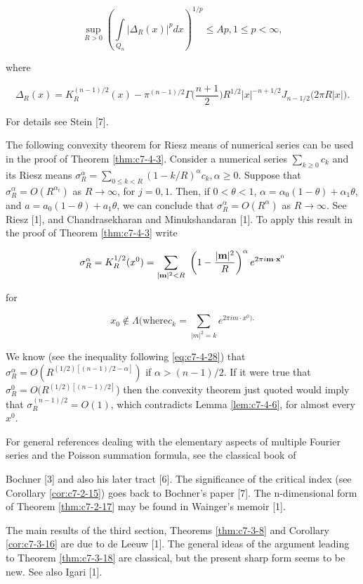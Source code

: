 \[
\sup_{R>0}\left(\int\limits_{Q_{n}}\left|\Delta_{R}(x)\right|^{p} dx\right)^{1/p}\leq A p,1\leq p<\infty,
\]

where

\[
\Delta_{R}(x)=K_{R}^{(n-1)/2}(x)-\pi^{(n-1)/2}\Gamma\biggl(\frac{n+1}{2}\biggr)R^{1/2}\big|x\big|^{-n+1/2}J_{n-1/2}(2\pi R|x|\big).
\]

For details see Stein [7].

 The following convexity theorem for Riesz means of numerical series can be used in the proof of Theorem \ref{thm:c7-4-3}. Consider a numerical series $\sum_{k \geq 0} c_k$ and its Riesz means $\sigma_R^\alpha = \sum_{0 \leq k < R} (1 - k/R)^\alpha c_k, \alpha \geq 0$. Suppose that $\sigma_R^\alpha = O(R^{\alpha_t})$ as $R \to \infty$, for $j = 0, 1$. Then, if $0 < \theta < 1$, $\alpha = \alpha_0(1 - \theta) + \alpha_1\theta$, and $a = a_0(1 - \theta) + a_1\theta$, we can conclude that $\sigma_R^\alpha = O(R^\alpha)$ as $R \to \infty$. See Riesz [1], and Chandrasekharan and Minukshandaran [1]. To apply this result in the proof of Theorem \ref{thm:c7-4-3} write

\[
\sigma_{R}^{\alpha}=K_{R}^{1/2}(x^{0})=\sum_{|{\bf m}|^{2}<R}\ \left(1-\frac{|{\bf m}|^{2}}{R}\right)^{\alpha}e^{2\pi i{\bf m}\cdot{\bf x}^{0}}
\]

for

\[
x_{0}\notin\Lambda\text{(where}c_{k}=\sum_{|m|^{2}=k}e^{2\pi i m\cdot x^{0}).}
\]

We know (see the inequality following \eqref{eq:c7-4-28}) that $\sigma_R^\alpha = O(R^{(1/2)[(n-1)/2-\alpha]})$ if $\alpha > (n-1)/2$. If it were true that $\sigma_R^0 = O(R^{(1/2)[(n-1)/2]}$) then the convexity theorem just quoted would imply that $\sigma_R^{(n-1)/2} = O(1)$, which contradicts Lemma \ref{lem:c7-4-6}, for almost every $x^0$.

\bibnoteshead

For general references dealing with the elementary aspects of multiple Fourier series and the Poisson summation formula, see the classical book of

Bochner [3] and also his later tract [6]. The significance of the critical index (see Corollary \ref{cor:c7-2-15}) goes back to Bochner's paper [7]. The n-dimensional form of Theorem \ref{thm:c7-2-17} may be found in Wainger's memoir [1].

The main results of the third section, Theorems \ref{thm:c7-3-8} and Corollary \ref{cor:c7-3-16} are due to de Leeuw [1]. The general ideas of the argument leading to Theorem \ref{thm:c7-3-18} are classical, but the present sharp form seems to be new. See also Igari [1].

